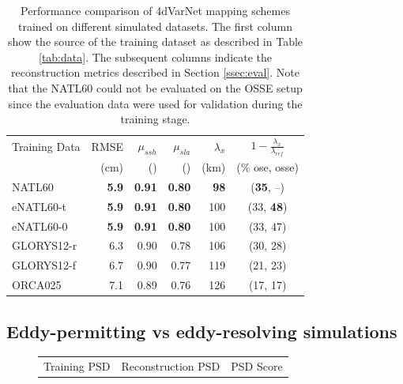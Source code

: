 \begin{bibunit}
\begin{table}[H]
\centering
\begin{tabular}{l||rrrrc}
\toprule
Training Data & RMSE  & $\mu_{ssh}$  & $\mu_{sla}$ & $\lambda_x$ & $1 - \frac{\lambda_x}{\lambda_{ref}}$ \\
 &  (cm) &  () &  () &  (km) & (\% ose, osse) \\
\midrule
NATL60 & \textbf{5.9}  & \textbf{0.91}  & \textbf{0.80}  & \textbf{98} & (\textbf{35}, --)\\
eNATL60-t & \textbf{5.9}  & \textbf{0.91}  & \textbf{0.80}  & 100 & (33, \textbf{48})\\
eNATL60-0 & \textbf{5.9}  & \textbf{0.91}  & \textbf{0.80}  & 100 & (33, 47)\\
GLORYS12-r & 6.3  & 0.90  & 0.78  & 106  & (30, 28)\\
GLORYS12-f & 6.7  & 0.90  & 0.77  & 119 & (21, 23)\\
ORCA025 & 7.1  & 0.89  & 0.76  & 126 & (17, 17)\\
\bottomrule
\end{tabular}

\caption{Performance comparison of 4dVarNet mapping schemes trained on different simulated datasets. The first column show the source of the training dataset as described in Table \ref{tab:data}. The subsequent columns indicate the reconstruction metrics described in Section \ref{ssec:eval}. Note that the NATL60 could not be evaluated on the OSSE setup since the evaluation data were used for validation during the training stage.}
\label{tab:res}
\end{table}

\subsection{Eddy-permitting vs eddy-resolving simulations}
\label{ssec:resolution}


\begin{figure}[H]
\small
\setlength{\tabcolsep}{1pt}
\begin{tabular}{ccc}

\hspace{3mm} Training PSD & 
\hspace{3mm} Reconstruction PSD & 
\hspace{3mm} PSD Score  \\



\end{tabular}
\end{figure}
\end{bibunit}
